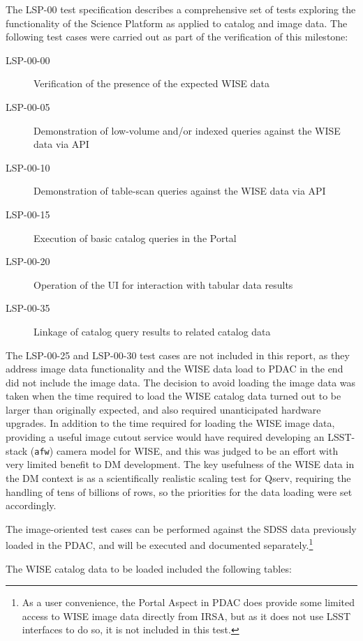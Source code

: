 \documentclass[DM,toc]{lsstdoc}
\begin{document}
The LSP-00 test specification describes a comprehensive set of tests exploring the functionality of the Science Platform as applied to catalog and image data.
The following test cases were carried out as part of the verification of this milestone:

\begin{description}
\item[LSP-00-00]{Verification of the presence of the expected WISE data}
\item[LSP-00-05]{Demonstration of low-volume and/or indexed queries against the WISE data via API}
\item[LSP-00-10]{Demonstration of table-scan queries against the WISE data via API}
\item[LSP-00-15]{Execution of basic catalog queries in the Portal}
\item[LSP-00-20]{Operation of the UI for interaction with tabular data results}
\item[LSP-00-35]{Linkage of catalog query results to related catalog data}
\end{description}

The LSP-00-25 and LSP-00-30 test cases are not included in this report, as they address image data functionality and the WISE data load to PDAC in the end did not include the image data.
The decision to avoid loading the image data was taken when the time required to load the WISE catalog data turned out to be larger than originally expected, and also required unanticipated hardware upgrades.
In addition to the time required for loading the WISE image data, providing a useful image cutout service would have required developing an LSST-stack (\verb|afw|) camera model for WISE, and this was judged to be an effort with very limited benefit to DM development.
The key usefulness of the WISE data in the DM context is as a scientifically realistic scaling test for Qserv, requiring the handling of tens of billions of rows, so the priorities for the data loading were set accordingly.

The image-oriented test cases can be performed against the SDSS data previously loaded in the PDAC, and will be executed and documented separately.\footnote{As a user convenience, the Portal Aspect in PDAC does provide some limited access to WISE image data directly from IRSA, but as it does not use LSST interfaces to do so, it is not included in this test.}

The WISE catalog data to be loaded included the following tables:
\end{document}
